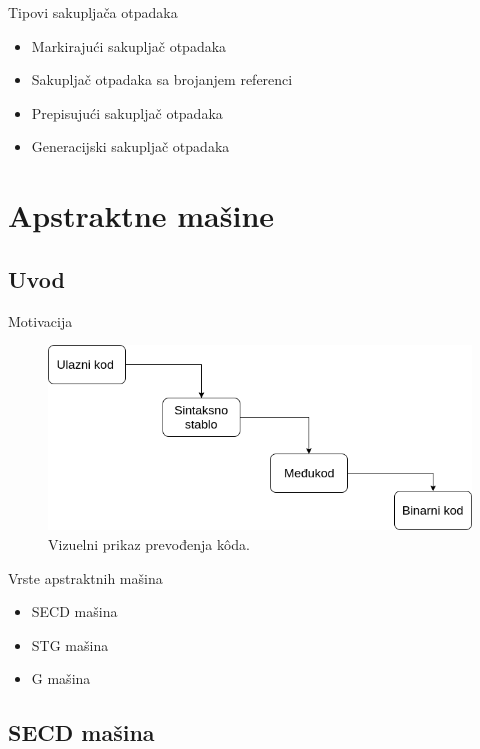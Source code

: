 \documentclass[xcolor={dvipsnames}, 11pt]{beamer}
\begin{document}
\begin{frame}{Tipovi sakupljača otpadaka}
	\begin{itemize}
		\item Markirajući sakupljač otpadaka
		\item Sakupljač otpadaka sa brojanjem referenci
		\item Prepisujući sakupljač otpadaka
		\item Generacijski sakupljač otpadaka
	\end{itemize}
\end{frame}



\section{Apstraktne mašine}
\subsection{Uvod}
\begin{frame}{Motivacija}
	\begin{figure}[H]
 		\centering
 		\includegraphics[width=\textwidth,height=\textheight,keepaspectratio]{slika1.png}
 		\caption{Vizuelni prikaz prevođenja k\^ oda.}
 		\label{fig:primerGmasine}
 	\end{figure}
\end{frame}

\begin{frame}{Vrste apstraktnih mašina}

	\begin{itemize}
	\item SECD mašina
	\item STG mašina
	\item G mašina
	\end{itemize}

\end{frame}

\subsection{SECD mašina}
\end{document}
